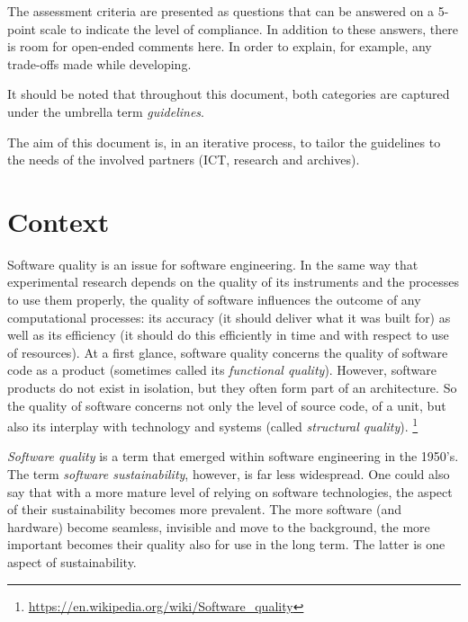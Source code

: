 \documentclass[a4paper,11pt]{article}
\begin{document}
The assessment criteria are presented as questions that can be answered on a
5-point scale to indicate the level of compliance. In addition to these
answers, there is room for open-ended comments here.  In order to explain, for
example, any trade-offs made while developing. 

It should be noted that throughout this document, both categories are captured
under the umbrella term \textit{guidelines}.  

The aim of this document
is, in an iterative process, to tailor
the guidelines to the needs of the involved partners (ICT, research and
archives). 

\section{Context}

Software quality is an issue for software engineering. In the same way that
experimental research depends on the quality of its instruments and the
processes to use them properly, the quality of software influences the outcome
of any computational processes: its accuracy (it should deliver what it
was built for) as well as its efficiency (it should do this efficiently in
time and with respect to use of resources). At a first glance, software
quality concerns the quality of software code as a product (sometimes
called its \emph{functional quality}). However, software products do not exist in
isolation, but they often form part of an architecture. So the quality of software
concerns not only the level of source code, of a unit, but also its interplay
with technology and systems (called \emph{structural quality}).
\footnote{\url{https://en.wikipedia.org/wiki/Software\_quality}}

\textit{Software quality} is a term that emerged within software
engineering in the 1950's. The term \textit{software sustainability}, however, is far less widespread. One
could also say that with a more mature level of relying on software
technologies, the aspect of their sustainability becomes more prevalent. The
more software (and hardware) become seamless, invisible and move to the
background, the more important becomes their quality also for use in the long
term. The latter is one aspect of sustainability.
\end{document}
